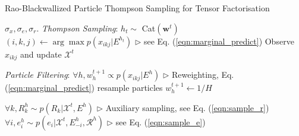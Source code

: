 \documentclass{article}
\begin{document}
%
%
%

\begin{algorithm}[t!]
   \caption{Rao-Blackwallized Particle Thompson Sampling for Tensor Factorisation}
   \label{alg:rbsmc}
\begin{algorithmic}
    $\sigma_x, \sigma_e, \sigma_r$.
   \STATE \textit{Thompson Sampling}:
   \STATE $h_t \sim $ Cat$(\mathbf{w}^{t})$
   \STATE $(i,k,j) \leftarrow \arg\max p(x_{ikj}| E^{h_t})$    \hfill $\triangleright$ see Eq. (\ref{eqn:marginal_predict})
   \STATE Observe $x_{ikj}$ and update $\mathcal{X}^{t}$

   \STATE \textit{Particle Filtering}:
   \STATE $\forall h, w_h^{t+1} \propto p(x_{ikj} | E^{h})$   \hfill $\triangleright$ Reweighting, Eq. (\ref{eqn:marginal_predict})
   \STATE resample particles
   \STATE $w_h^{t+1} \leftarrow 1/H$
   \ENDIF

   \STATE $\forall k, R_k^{h} \sim p(R_k | \mathcal{X}^{t}, E^{h})$   \hfill $\triangleright$ Auxiliary sampling, see Eq. (\ref{eqn:sample_r})
   \STATE $\forall i, e^{h}_i \sim p(e_i | \mathcal{X}^{t}, E^{h}_{-i}, \mathcal{R}^{h})$ \hfill $\triangleright$ see Eq. (\ref{eqn:sample_e})
   \ENDFOR

   \ENDFOR
\end{algorithmic}
\end{algorithm}
\end{document}
